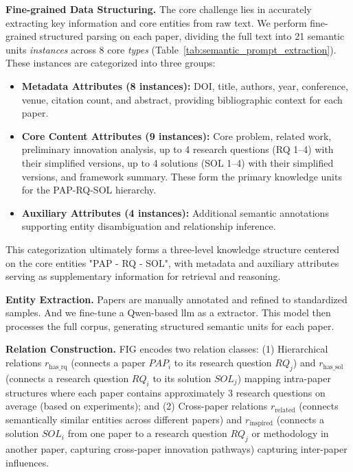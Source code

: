 \documentclass[runningheads]{llncs}
\begin{document}
\textbf{Fine-grained Data Structuring.} The core challenge lies in accurately extracting key information and core entities from raw text. We perform fine-grained structured parsing on each paper, dividing the full text into 21 semantic units \textit{instances} across 8 core \textit{types} (Table~\ref{tab:semantic_prompt_extraction}). These instances are categorized into three groups:
\begin{itemize}[leftmargin=*]
    \item \textbf{Metadata Attributes (8 instances):} DOI, title, authors, year, conference, venue, citation count, and abstract, providing bibliographic context for each paper.
    \item \textbf{Core Content Attributes (9 instances):} Core problem, related work, preliminary innovation analysis, up to 4 research questions (RQ 1--4) with their simplified versions, up to 4 solutions (SOL 1--4) with their simplified versions, and framework summary. These form the primary knowledge units for the PAP-RQ-SOL hierarchy.
    \item \textbf{Auxiliary Attributes (4 instances):} Additional semantic annotations supporting entity disambiguation and relationship inference.
\end{itemize}
This categorization ultimately forms a three-level knowledge structure centered on the core entities "PAP - RQ - SOL", with metadata and auxiliary attributes serving as supplementary information for retrieval and reasoning.

\textbf{Entity Extraction.} Papers are manually annotated and refined to standardized samples. And we fine-tune a Qwen-based llm as a extractor. This model then processes the full corpus, generating structured semantic units for each paper.

\textbf{Relation Construction.} FIG encodes two relation classes: (1) Hierarchical relations $r_{\text{has\_rq}}$ (connects a paper $PAP_i$ to its research question $RQ_j$) and $r_{\text{has\_sol}}$ (connects a research question $RQ_i$ to its solution $SOL_j$) mapping intra-paper structures where each paper contains approximately 3 research questions on average (based on experiments); and (2) Cross-paper relations $r_{\text{related}}$ (connects semantically similar entities across different papers) and $r_{\text{inspired}}$ (connects a solution $SOL_i$ from one paper to a research question $RQ_j$ or methodology in another paper, capturing cross-paper innovation pathways) capturing inter-paper influences.
\end{document}
